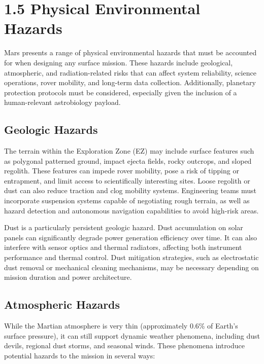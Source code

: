 \section*{1.5 Physical Environmental Hazards}

Mars presents a range of physical environmental hazards that must be accounted for when designing any surface mission. These hazards include geological, atmospheric, and radiation-related risks that can affect system reliability, science operations, rover mobility, and long-term data collection. Additionally, planetary protection protocols must be considered, especially given the inclusion of a human-relevant astrobiology payload.

\subsection*{Geologic Hazards}

The terrain within the Exploration Zone (EZ) may include surface features such as polygonal patterned ground, impact ejecta fields, rocky outcrops, and sloped regolith. These features can impede rover mobility, pose a risk of tipping or entrapment, and limit access to scientifically interesting sites. Loose regolith or dust can also reduce traction and clog mobility systems. Engineering teams must incorporate suspension systems capable of negotiating rough terrain, as well as hazard detection and autonomous navigation capabilities to avoid high-risk areas.

Dust is a particularly persistent geologic hazard. Dust accumulation on solar panels can significantly degrade power generation efficiency over time. It can also interfere with sensor optics and thermal radiators, affecting both instrument performance and thermal control. Dust mitigation strategies, such as electrostatic dust removal or mechanical cleaning mechanisms, may be necessary depending on mission duration and power architecture.

\subsection*{Atmospheric Hazards}

While the Martian atmosphere is very thin (approximately 0.6\% of Earth's surface pressure), it can still support dynamic weather phenomena, including dust devils, regional dust storms, and seasonal winds. These phenomena introduce potential hazards to the mission in several ways:

